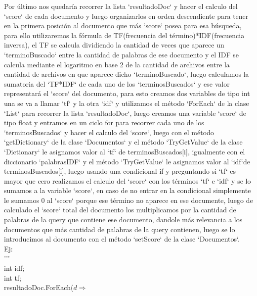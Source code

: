 \documentclass{article}
\begin{document}
Por último nos quedaría recorrer la lista `resultadoDoc` y hacer el calculo del `score`
de cada documento y luego organizarlos en orden descendiente para tener en la primera
posición al documento que más `score` posea para esa búsqueda, para ello utilizaremos 
la fórmula de TF(frecuencia del término)*IDF(frecuencia inversa), el TF se calcula
dividiendo la cantidad de veces que aparece un `terminoBuscado` entre la cantidad 
de palabras de ese documento y el IDF se calcula mediante el logaritmo en base 2 de
la cantidad de archivos entre la cantidad de archivos en que aparece dicho `terminoBuscado`,
luego calculamos la sumatoria del `TF*IDF` de cada uno de los `terminosBuscados` y ese valor
representará el `score` del documento, para esto creamos dos variables de tipo int una se
va a llamar `tf` y la otra `idf` y utilizamos el método `ForEach` de la clase `List` 
para recorrer la lista `resultadoDoc`, luego creamos una variable `score` de tipo float
y entramos en un ciclo for para recorrer cada uno de los `terminosBuscados` y hacer 
el calculo del `score`, luego con el método `getDictionary` de la clase `Documentos`
y el método `TryGetValue` de la clase `Dictionary` le asignamos valor al `tf` de 
terminosBuscados[i], igualmente con el diccionario `palabrasIDF` y el método `TryGetValue`
le asignamos valor al `idf`de terminosBuscados[i], luego usando una condicional if y 
preguntando si `tf` es mayor que cero realizamos el calculo del `score` con los términos
`tf` e `idf` y se lo sumamos a la variable `score`, en caso de no entrar en la 
condicional simplemente le sumamos 0 al `score` porque ese término no aparece en 
ese documente, luego de calculado el `score` total del documento los multiplicamos 
por la cantidad de palabras de la query que contiene ese documento, dandole más 
relevancia a los documentos que más cantidad de palabras de la query contienen, 
luego se lo introducimos al documento con el método `setScore` de la clase `Documentos`.\\
Ej:\\
'''\\
int idf;\\
int tf;\\
resultadoDoc.ForEach($d \Rightarrow $ \\
\end{document}
